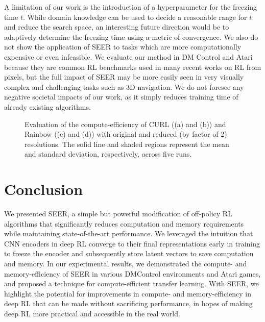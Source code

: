 \documentclass{article}
\begin{document}
A limitation of our work is the introduction of a hyperparameter for the freezing time $t$. While domain knowledge can be used to decide a reasonable range for $t$ and reduce the search space, an interesting future direction would be to adaptively determine the freezing time using a metric of convergence. We also do not show the application of SEER to tasks which are more computationally expensive or even infeasible. We evaluate our method in DM Control and Atari because they are common RL benchmarks used in many recent works on RL from pixels, but the full impact of SEER may be more easily seen in very visually complex and challenging tasks such as 3D navigation. We do not foresee any negative societal impacts of our work, as it simply reduces training time of already existing algorithms.

\begin{figure*} [t] \centering
{} 
\caption{Evaluation of the compute-efficiency of CURL ((a) and (b)) and Rainbow ((c) and (d)) with original and reduced (by factor of 2) resolutions. The solid line and shaded regions represent the mean and standard deviation, respectively, across five runs.} \label{fig:reduce_res_results}
\end{figure*}

\section{Conclusion}
We presented SEER, a simple but powerful modification of off-policy RL algorithms that significantly reduces computation and memory requirements while maintaining state-of-the-art performance. We leveraged the intuition that CNN encoders in deep RL converge to their final representations early in training to freeze the encoder and subsequently store latent vectors to save computation and memory. In our experimental results, we demonstrated the compute- and memory-efficiency of SEER in various DMControl environments and Atari games, and proposed a technique for compute-efficient transfer learning. With SEER, we highlight the potential for improvements in compute- and memory-efficiency in deep RL that can be made without sacrificing performance, in hopes of making deep RL more practical and accessible in the real world. 
\end{document}
